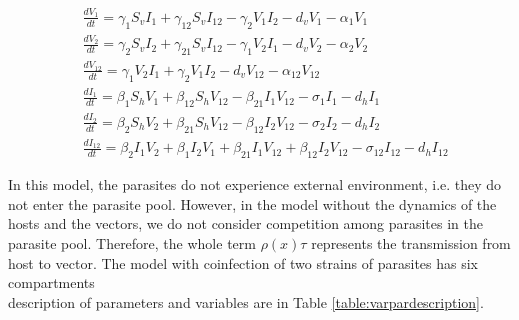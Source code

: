 \documentclass{article}
\begin{document}
\begin{align*}
&  \frac{dV_1}{dt} = \gamma_1 S_v I_1  +  \gamma_{12} S_v I_{12}  - \gamma_2 V_1 I_2 - d_v V_1 - \alpha_1 V_1 \\
& \frac{dV_2}{dt} = \gamma_2 S_v I_2 + \gamma_{21} S_v I_{12} - \gamma_1 V_2 I_1 -   d_v V_2 - \alpha_2 V_2 \\
& \frac{dV_{12}}{dt} = \gamma_1 V_2 I_1 + \gamma_2 V_1 I_2  -   d_v V_{12} - \alpha_{12} V_{12}\\
& \frac{dI_1}{dt} = \beta_1 S_h V_1  + \beta_{12} S_h V_{12}  - \beta_{21}  I_1 V_{12} - \sigma_1 I_1  - d_h I_1\\
& \frac{dI_2}{dt} = \beta_2 S_h V_2 + \beta_{21} S_h V_{12} - \beta_{12} I_2 V_{12} - \sigma_2 I_2 - d_h I_2\\
& \frac{dI_{12}}{dt} = \beta_2 I_1 V_2 + \beta_1 I_2 V_1 + \beta_{21} I_1 V_{12} + \beta_{12} I_2 V_{12} - \sigma_{12} I_{12} - d_h I_{12}
\end{align*}

In this model, the parasites do not experience external environment, i.e. they do not enter the parasite pool. However, in the model without the dynamics of the hosts and the vectors, we do not consider competition among parasites in the parasite pool. Therefore, the whole term $\rho(x) \tau$ represents the transmission from host to vector. The model with coinfection of two strains of parasites has six compartments \\ description of parameters and variables are in Table \ref{table:varpardescription}.
\end{document}
